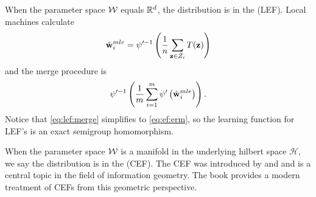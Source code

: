 \documentclass[thesis.tex]{subfiles}
\newcommand{\set}[1]{\mathcal {#1}}
\newcommand{\p}[1]{p\left({#1}\right)}
\begin{document}
\begin{method}
    When the parameter space ${\mathcal W}$ equals $\mathbb R^d$,
    the distribution is in the  (LEF).
    Local machines calculate 
    \begin{equation}
        \hat{\mathbf w}^{mle}_i
        = \psi'^{-1} \left(\frac{1}{n} \sum_{\mathbf z\in Z_i} T(\mathbf z) \right)
    \end{equation}
    and the merge procedure is
    \begin{equation}
        \label{eq:lef:merge}
        \psi'^{-1} 
        \left(
            \frac{1}{m} \sum_{i=1}^m \psi' \left(\hat{\mathbf w}^{mle}_i\right)
        \right)
        .
    \end{equation}
    Notice that \eqref{eq:lef:merge} simplifies to \eqref{eq:ef:erm},
    so the learning function for LEF's is an exact semigroup homomorphism.
\end{method}

When the parameter space ${\mathcal W}$ is a manifold in the underlying hilbert space $\set H$,
we say the distribution is in the  (CEF). 
The CEF was introduced by \citet{efron1975defining} and \citet{amari1982differential} and is a central topic in the field of information geometry.
The book \citet{amari2016information} provides a modern treatment of CEFs from this geometric perspective.

%

\end{document}
